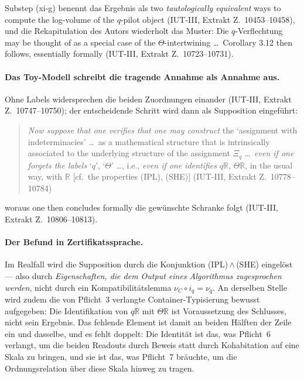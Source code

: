 \documentclass[11pt,a4paper]{article}
\theoremstyle{definition}
\newcommand{\anchor}[2]{(#1, Extrakt Z.~#2)}
\begin{document}
Substep (xi-g) benennt das Ergebnis als \glqq two \emph{tautologically equivalent} ways
to compute the log-volume of the $q$-pilot object\grqq
\anchor{IUT-III}{10453--10458}, und die Rekapitulation des Autors wiederholt das
Muster: Die $q$-Verflechtung \glqq may be thought of as a special case of the
$\Theta$-intertwining \dots\ Corollary 3.12 then follows, essentially formally\grqq
\anchor{IUT-III}{10723--10731}.

\paragraph{Das Toy-Modell schreibt die tragende Annahme als Annahme aus.} Ohne
Labels widersprechen die beiden Zuordnungen einander
\anchor{IUT-III}{10747--10750}; der entscheidende Schritt wird dann als
Supposition eingeführt:

\begin{quote}\small
\glqq \emph{Now suppose that one verifies that one may construct} the `assignment with
indeterminacies' \dots\ as a mathematical structure that is intrinsically
associated to the underlying structure of the assignment $\Xi_q$ \dots\
\emph{even if one forgets the labels} `$q$', `$\Theta$' \dots, i.e., \emph{even if
one identifies} $q\mathbb{R}$, $\Theta\mathbb{R}$, in the usual way, with
$\mathbb{R}$ [cf.\ the properties (IPL), (SHE)]\grqq
\hfill\anchor{IUT-III}{10778--10784}
\end{quote}

woraus \glqq one then concludes formally\grqq{} die gewünschte Schranke folgt
\anchor{IUT-III}{10806--10813}.

\paragraph{Der Befund in Zertifikatssprache.} Im Realfall wird die Supposition
durch die Konjunktion (IPL)\,$\wedge$\,(SHE) eingelöst --- also durch
\emph{Eigenschaften, die dem Output eines Algorithmus zugesprochen werden}, nicht
durch ein Kompatibilitätslemma $\nu_C \circ i_q = \nu_q$. An derselben Stelle wird
zudem die von Pflicht~3 verlangte Container-Typisierung bewusst aufgegeben: Die
Identifikation von $q\mathbb{R}$ mit $\Theta\mathbb{R}$ ist Voraussetzung des
Schlusses, nicht sein Ergebnis. Das fehlende Element ist damit an beiden Hälften
der Zeile ein und dasselbe, und es fehlt doppelt: Die Identität ist das, was
Pflicht~6 verlangt, um die beiden Readouts durch Beweis statt durch Kohabitation
auf eine Skala zu bringen, und sie ist das, was Pflicht~7 bräuchte, um die
Ordnungsrelation über diese Skala hinweg zu tragen.
\end{document}
